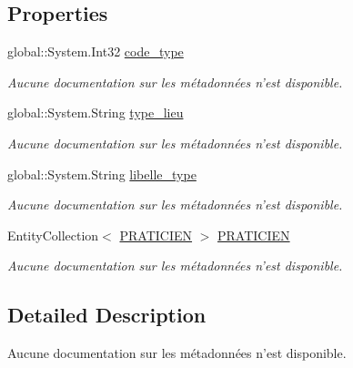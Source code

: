 \subsection*{Properties}
\begin{DoxyCompactItemize}
\item 
global\-::\-System.\-Int32 \hyperlink{class_model_1_1_t_y_p_e___p_r_a_t_i_c_i_e_n_a48244203401f53911cbb4b3981cd6adc}{code\-\_\-type}
\begin{DoxyCompactList}\small\item\em Aucune documentation sur les métadonnées n'est disponible. \end{DoxyCompactList}\item 
global\-::\-System.\-String \hyperlink{class_model_1_1_t_y_p_e___p_r_a_t_i_c_i_e_n_a1763dc779611fa8988840c66d8097bbb}{type\-\_\-lieu}
\begin{DoxyCompactList}\small\item\em Aucune documentation sur les métadonnées n'est disponible. \end{DoxyCompactList}\item 
global\-::\-System.\-String \hyperlink{class_model_1_1_t_y_p_e___p_r_a_t_i_c_i_e_n_ad800514647304706a6b72928af0e16d3}{libelle\-\_\-type}
\begin{DoxyCompactList}\small\item\em Aucune documentation sur les métadonnées n'est disponible. \end{DoxyCompactList}\item 
Entity\-Collection$<$ \hyperlink{class_model_1_1_p_r_a_t_i_c_i_e_n}{P\-R\-A\-T\-I\-C\-I\-E\-N} $>$ \hyperlink{class_model_1_1_t_y_p_e___p_r_a_t_i_c_i_e_n_a4607a2ba91f71fb88ce4f80a1473f43a}{P\-R\-A\-T\-I\-C\-I\-E\-N}
\begin{DoxyCompactList}\small\item\em Aucune documentation sur les métadonnées n'est disponible. \end{DoxyCompactList}\end{DoxyCompactItemize}


\subsection{Detailed Description}
Aucune documentation sur les métadonnées n'est disponible. 




